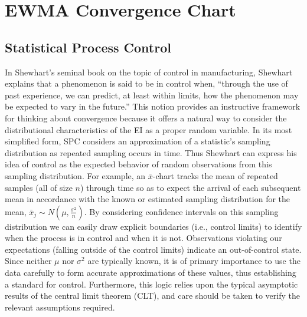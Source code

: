 \documentclass[12pt]{article}
\begin{document}
%
%
\section{EWMA Convergence Chart}
\label{sec:convergence}
%
%

%
%
\subsection{Statistical Process Control}
%
%

%
In Shewhart's seminal book \citep{shewhartBook} on the topic of control in manufacturing, Shewhart explains that a phenomenon is said to be in control when, ``through the use of past experience, we can predict, at least within limits, how the phenomenon may be expected to vary in the future.''
This notion provides an instructive framework for thinking about convergence because it offers a natural way to consider the distributional characteristics of the EI as a proper random variable. 
In its most simplified form, SPC considers an approximation of a statistic's sampling distribution as repeated sampling occurs in time.
Thus Shewhart can express his idea of control as the expected behavior of random observations from this sampling distribution.
For example, an $\bar x$-chart tracks the mean of repeated samples (all of size $n$) through time so as to expect the arrival of each subsequent mean in accordance with the known or estimated sampling distribution for the mean, $\bar{x}_j \sim N\left(\mu, \frac{\sigma^2}{n}\right)$.   
%
%
By considering confidence intervals on this sampling distribution we can easily draw explicit boundaries (i.e., control limits) to identify when the process is in control and when it is not.
%
Observations violating our expectations (falling outside of the control limits) indicate an out-of-control state.
%
Since neither $\mu$ nor $\sigma^2$ are typically known, it is of primary importance to use the data carefully to form accurate approximations of these values, thus establishing a standard for control.
%
Furthermore, this logic relies upon the typical asymptotic results of the central limit theorem (CLT), and care should be taken to verify the relevant assumptions required.
\end{document}
